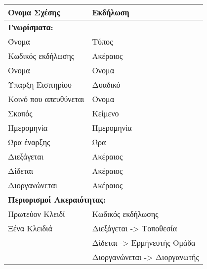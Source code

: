 \begin{tabular}{|p{6cm}|p{8cm}|}
  \hline
  Όνομα Σχέσης          & Εκδήλωση                         \\ \hline
  \multicolumn{2}{|l|}{\textbf{Γνωρίσματα:}}               \\ \hline
  Όνομα                 & Τύπος                            \\ \hline
  Κωδικός εκδήλωσης     & Ακέραιος                         \\ \hline
  Όνομα                 & Όνομα                            \\ \hline
  Ύπαρξη Εισιτηρίου     & Δυαδικό                          \\ \hline
  Κοινό που απευθύνεται & Όνομα                            \\ \hline
  Σκοπός                & Κείμενο                          \\ \hline
  Ημερομηνία            & Ημερομηνία                       \\ \hline
  Ώρα έναρξης           & Ώρα                              \\ \hline
  Διεξάγεται            & Ακέραιος                         \\ \hline
  Δίδεται               & Ακέραιος                         \\ \hline
  Διοργανώνεται         & Ακέραιος                         \\ \hline
  \multicolumn{2}{|l|}{\textbf{Περιορισμοί Ακεραιότητας:}} \\ \hline
  Πρωτεύον Κλειδί       & Κωδικός εκδήλωσης                \\ \hline
  Ξένα Κλειδιά          & Διεξάγεται -> Τοποθεσία          \\ \cline{2-2}
                        & Δίδεται -> Ερμήνευτής-Ομάδα      \\ \cline{2-2}
                        & Διοργανώνεται -> Διοργανωτής     \\ \hline
\end{tabular}

